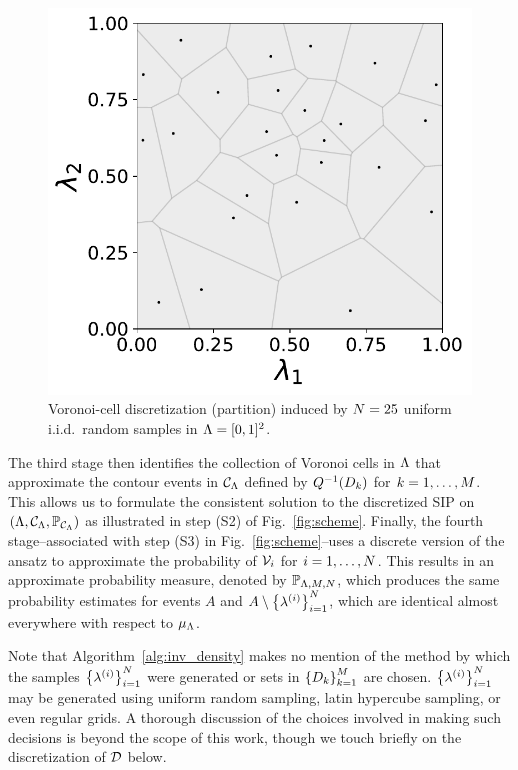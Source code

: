 \begin{figure}[ht]
\centering
	\begin{minipage}{.475\textwidth}
		\includegraphics[width=\linewidth]{./images/voronoi_diagrams/voronoi_diagram_N25_r0}
	\end{minipage}
\caption{
Voronoi-cell discretization (partition) induced by $N = 25 $ uniform i.i.d.~random samples in ${\Lambda} = [0,1]^2$.
}
\label{fig:voronoi_cells}
\end{figure}

The third stage then identifies the collection of Voronoi cells in ${\Lambda}$ that approximate the contour events in $\mathcal{C}_{{\Lambda}}$ defined by $Q^{-1}(D_k)$ for $k=1,\hdots,M$. This allows us to formulate the consistent solution to the discretized SIP on $({\Lambda}, \mathcal{C}_{{\Lambda}}, \operatorname*{\mathbb{P}_{\mathcal{C}_{{\Lambda}}}})$ as illustrated in step (S2) of Fig.~\ref{fig:scheme}.
Finally, the fourth stage\---associated with step (S3) in Fig.~\ref{fig:scheme}\---uses a discrete version of the ansatz to approximate the probability of $\mathcal{V}_i$ for $i=1,\dots,N$.
This results in an approximate probability measure, denoted by $\mathbb{P}_{{\Lambda}, M, N}$, which produces the same probability estimates for events $A$ and $A\setminus \left\{ \lambda^{(i)} \right\}_{i=1}^N$, which are identical almost everywhere with respect to $\mu_{{\Lambda}}$.

Note that Algorithm~\ref{alg:inv_density} makes no mention of the method by which the samples $\left\{ \lambda^{(i)} \right\}_{i=1}^{N}$ were generated or sets in $\left\{D_k\right\}_{k=1}^{M}$ are chosen.
$\left\{ \lambda^{(i)} \right\}_{i=1}^{N}$ may be generated using uniform random sampling, latin hypercube sampling, or even regular grids.
A thorough discussion of the choices involved in making such decisions is beyond the scope of this work, though we touch briefly on the discretization of $\mathcal{D}$ below.
